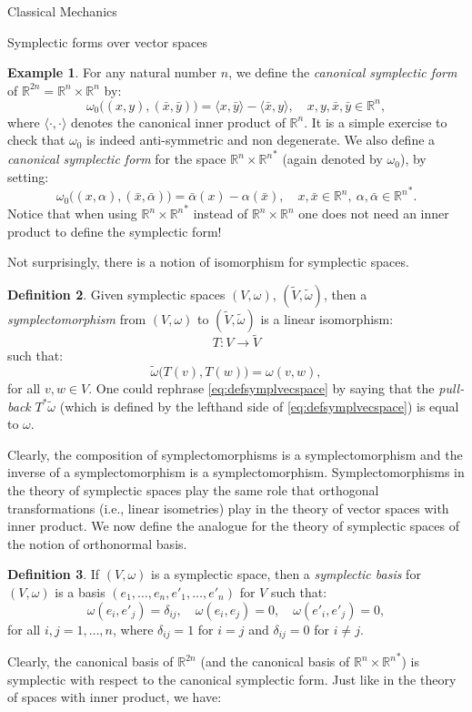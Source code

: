 \documentclass[oneside,a4paper,11pt]{amsbook}
\newcommand{\R}{\mathds R}
\theoremstyle{remark}\newtheorem{exercise}{Exercise}[chapter]
\theoremstyle{plain}\newtheorem{teo}{Theorem}[section]
\theoremstyle{plain}\newtheorem{lem}[teo]{Lemma}
\theoremstyle{plain}\newtheorem{prop}[teo]{Proposition}
\theoremstyle{plain}\newtheorem{cor}[teo]{Corollary}
\theoremstyle{definition}\newtheorem{defin}[teo]{Definition}
\theoremstyle{remark}\newtheorem{rem}[teo]{Remark}
\theoremstyle{definition}\newtheorem{notation}[teo]{Notation}
\theoremstyle{definition}\newtheorem{convention}[teo]{Convention}
\theoremstyle{definition}\newtheorem{example}[teo]{Example}
\numberwithin{section}{chapter}
\numberwithin{equation}{section}
\begin{document}
\begin{chapter}{Classical Mechanics}
\begin{section}{Symplectic forms over vector spaces}
\begin{example}\label{exa:cansymplform}
For any natural number $n$, we define the {\em canonical symplectic form\/} of $\R^{2n}=\R^n\times\R^n$ by:
\[\omega_0\big((x,y),(\bar x,\bar y)\big)=\langle x,\bar y\rangle-\langle\bar x,y\rangle,\quad x,y,\bar x,\bar y\in\R^n,\]
where $\langle\cdot,\cdot\rangle$ denotes the canonical inner product of $\R^n$. It is a simple exercise
to check that $\omega_0$ is indeed anti-symmetric and non degenerate. We also define
a {\em canonical symplectic form\/} for the space $\R^n\times{\R^n}^*$ (again denoted by $\omega_0$), by setting:
\[\omega_0\big((x,\alpha),(\bar x,\bar\alpha)\big)=\bar\alpha(x)-\alpha(\bar x),\quad x,\bar x\in\R^n,\ \alpha,\bar\alpha\in{\R^n}^*.\]
Notice that when using $\R^n\times{\R^n}^*$ instead of $\R^n\times\R^n$ one does not need an inner product to define the symplectic
form!
\end{example}

Not surprisingly, there is a notion of isomorphism for symplectic spaces.
\begin{defin}
Given symplectic spaces $(V,\omega)$, $(\widetilde V,\tilde\omega)$, then a {\em symplectomorphism\/} from $(V,\omega)$
to $(\widetilde V,\tilde\omega)$ is a linear isomorphism:
\[T:V\longrightarrow\widetilde V\]
such that:
\begin{equation}\label{eq:defsymplvecspace}
\tilde\omega\big(T(v),T(w)\big)=\omega(v,w),
\end{equation}
for all $v,w\in V$. One could rephrase \eqref{eq:defsymplvecspace} by saying that the {\em pull-back\/}
$T^*\tilde\omega$ (which is defined by the lefthand side of \eqref{eq:defsymplvecspace}) is equal to $\omega$.
\end{defin}
Clearly, the composition of symplectomorphisms is a symplectomorphism and the inverse of a symplectomorphism
is a symplectomorphism. Symplectomorphisms in the theory of symplectic spaces play the same role that orthogonal
transformations (i.e., linear isometries) play in the theory of vector spaces with inner product.
We now define the analogue for the theory of symplectic spaces of the notion of orthonormal basis.

\begin{defin}
If $(V,\omega)$ is a symplectic space, then a {\em symplectic basis\/} for $(V,\omega)$ is a basis
$(e_1,\ldots,e_n,e'_1,\ldots,e'_n)$ for $V$ such that:
\[\omega(e_i,e'_j)=\delta_{ij},\quad\omega(e_i,e_j)=0,\quad\omega(e'_i,e'_j)=0,\]
for all $i,j=1,\ldots,n$, where $\delta_{ij}=1$ for $i=j$ and $\delta_{ij}=0$ for $i\ne j$.
\end{defin}
Clearly, the canonical basis of $\R^{2n}$ (and the canonical basis of $\R^n\times{\R^n}^*$)
is symplectic with respect to the canonical symplectic form. Just like in the theory of spaces with inner product, we have:


\end{section}
\end{chapter}
\end{document}
